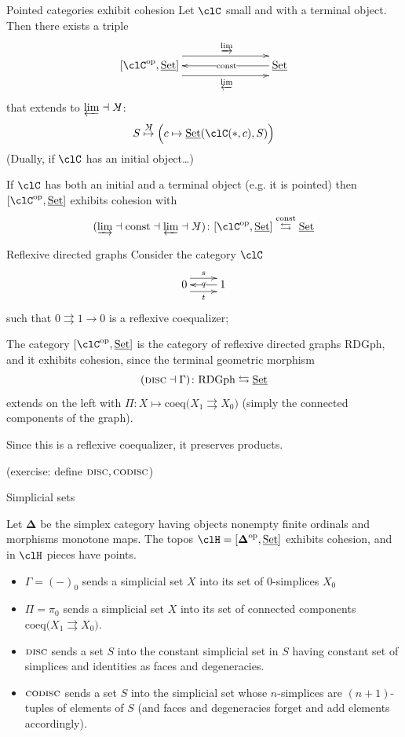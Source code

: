 \documentclass[presentation]{beamer}
\begin{document}
%
%
%
%
%
%
%
\begin{frame}{Pointed categories exhibit cohesion}
	\def\coconst{\rotatebox[origin=c]{180}{$K$}}
	Let $\clC$ small and with a terminal object. Then there exists a triple
	\[
		\xymatrix@C=2cm{
		**[l] [\clC^\text{op},\Set] \ar@<9pt>[r]^\varinjlim \ar@<-9pt>[r]_\varprojlim & \ar[l]|{\text{const}} \Set
		}
	\]
	that extends to $\varprojlim\dashv \coconst$:
	\[
		S\overset{{\footnotesize\coconst}}\mapsto \Big( c\mapsto \Set(\clC(*,c),S) \Big)
	\]
	\onslide<+->
	(Dually, if $\clC$ has an initial object\dots)
	\onslide<+->
	\begin{prop}
		If $\clC$ has both an initial and a terminal object (e.g. it is pointed) then $[\clC^\text{op},\Set]$ exhibits cohesion with
		\[
			(\varinjlim \dashv \text{const} \dashv \varprojlim \dashv \coconst) \colon [\clC^\text{op},\Set] \overset{\text{const}}\leftrightarrows \Set
		\]
	\end{prop}
\end{frame}
%
%
%
%
%
%
%
\begin{frame}{Reflexive directed graphs}
	Consider the category $\clC$
	\[
		\xymatrix{
			0 \ar@<6pt>[r]^s \ar@<-6pt>[r]_t & \ar[l]|q 1
		}
	\]
	such that $0 \rightrightarrows 1 \to 0$ is a reflexive coequalizer;

	\onslide<+->
	The category $[\clC^\text{op},\Set]$ is the category of \alert{reflexive directed graphs} $\text{RDGph}$, and it exhibits cohesion, since the terminal geometric morphism
	\[
		(\textsc{disc}\dashv\Gamma)\colon \text{RDGph} \leftrightarrows \underline{\text{Set}}
	\]
	extends on the left with $\Pi\colon X \mapsto \text{coeq}\Big( X_1 \rightrightarrows X_0\Big)$ (simply the connected components of the graph).

	Since this is a reflexive coequalizer, it preserves products.

	(exercise: define $\textsc{disc}, \textsc{codisc}$)
\end{frame}
%
%
%
%
%
%
%
\begin{frame}{Simplicial sets}
	\begin{prop}
		Let $\boldsymbol\Delta$ be the \alert{simplex category} having objects nonempty finite ordinals and morphisms monotone maps. The topos $\clH=[\boldsymbol\Delta^\text{op}, \Set]$ exhibits cohesion, and in $\clH$ pieces have points.
	\end{prop}
	\begin{itemize}
		\item<+-> $\Gamma = (-)_0$ sends a simplicial set $X$ into its set of 0-simplices $X_0$
		\item<+-> $\Pi=\pi_0$ sends a simplicial set $X$ into its set of connected components $\text{coeq}\Big( X_1 \rightrightarrows X_0\Big)$.
		\item<+-> $\textsc{disc}$ sends a set $S$ into the constant simplicial set in $S$ having constant set of simplices and identities as faces and degeneracies.
		\item<+-> $\textsc{codisc}$ sends a set $S$ into the simplicial set whose $n$-simplices are $(n+1)$-tuples of elements of $S$ (and faces and degeneracies forget and add elements accordingly).
	\end{itemize}
\end{frame}
\end{document}
